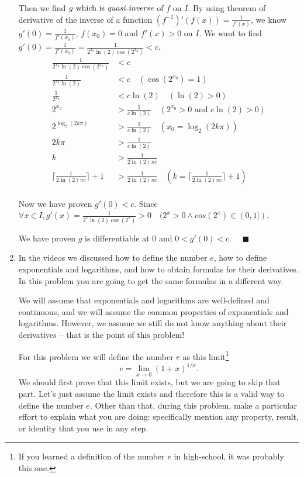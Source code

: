 \documentclass[12pt]{exam}
\newcommand{\vv}{\vspace{.1cm}}
\begin{document}
\begin{enumerate}
Then we find $g \mbox{ which is } \emph{quasi-inverse}$ of $f$ on $I$. By using theorem of derivative of the inverse of a function $(f^{-1})'(f(x)) = \frac{1}{f'(x)}$, we know $g'(0)=\frac{1}{f'(x_0)}$, $f(x_0)=0$ and $f'(x)>0$ on $I.$ We want to find $g'(0)=\frac{1}{f'(x_0)}=\frac{1}{2^{x_0}\ln(2)\cos(2^{x_0})}<c,$
\begin{align*}
    \frac{1}{2^{x_0}\ln(2)\cos(2^{x_0})}&<c\\
    \frac{1}{2^{x_0}\ln(2)}&<c\quad(\cos(2^{x_0})=1)\\
    \frac{1}{2^{x_0}}&<c\ln(2)\quad(\ln(2)>0)\\
    2^{x_0}&>\frac{1}{c\ln(2)}\quad(2^{x_0}>0\mbox{ and }c\ln(2)>0)\\
    2^{\log_2(2k\pi)}&>\frac{1}{c\ln(2)}\quad(x_0=\log_2(2k\pi))\\
    2k\pi&>\frac{1}{c\ln(2)}\\
    k&>\frac{1}{2\ln(2)\pi c}\\
    \lceil\frac{1}{2\ln(2)\pi c}\rceil+1&>\frac{1}{2\ln(2)\pi c}\quad(k=\lceil\frac{1}{2\ln(2)\pi c}\rceil+1)\\
\end{align*}

Now we have proven $g'(0)<c$. Since $\forall x\in I, g'(x)= \frac{1}{2^x\ln(2)\cos(2^x)}>0\quad(2^x>0\land cos(2^x)\in(0,1])$.

We have proven $g$ is differentiable at 0 and $0 < g'(0) < c$. $\quad\blacksquare$

\vv
\newpage

\item  In the videos we discussed how to define the number $e$, how to define exponentials and logarithms, and how to obtain formulas for their derivatives.      In this problem you are going to get the same formulas in a different way.

We will assume that exponentials and logarithms are well-defined and continuous, and we will assume the common properties of exponentials and logarithms.   However, we assume we still do not know anything about their derivatives -- that is the point of this problem!

For this problem we will define the number $e$ as this limit\footnote{If you learned a definition of the number $e$ in high-school, it was probably this one.}
	\begin{equation}  \label{eq:e}
		e = \lim_{x \to 0} \left( 1 + x \right)^{1/x}.
	\end{equation}
We should first prove that this limit exists, but we are going to skip that part.  Let's just assume the limit exists and therefore this is a valid way to define the number $e$.
  Other than that, during this problem, make a particular effort to explain what you are doing: specifically mention any property, result, or identity that you use in any step.


\end{enumerate}
\end{document}
